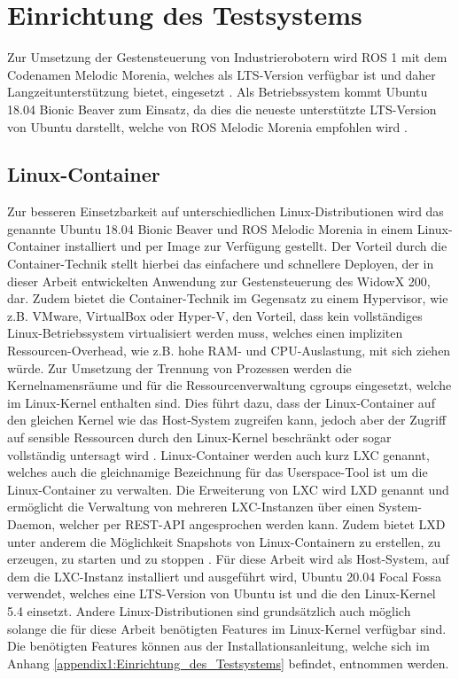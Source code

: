 \section{Einrichtung des Testsystems}
Zur Umsetzung der Gestensteuerung von Industrierobotern wird ROS 1 mit dem Codenamen Melodic Morenia, welches als LTS-Version verfügbar ist und daher Langzeitunterstützung bietet, eingesetzt \cite{robot_operating_system_2020}. Als Betriebssystem kommt Ubuntu 18.04 Bionic Beaver zum Einsatz, da dies die neueste unterstützte LTS-Version von Ubuntu darstellt, welche von ROS Melodic Morenia empfohlen wird \cite{ros_distributions_nodate}.

\subsection{Linux-Container}
Zur besseren Einsetzbarkeit auf unterschiedlichen Linux-Distributionen wird das genannte Ubuntu 18.04 Bionic Beaver und ROS Melodic Morenia in einem Linux-Container installiert und per Image zur Verfügung gestellt. Der Vorteil durch die Container-Technik stellt hierbei das einfachere und schnellere Deployen, der in dieser Arbeit entwickelten Anwendung zur Gestensteuerung des WidowX 200, dar. Zudem bietet die Container-Technik im Gegensatz zu einem Hypervisor, wie z.B. VMware, VirtualBox oder Hyper-V, den Vorteil, dass kein vollständiges Linux-Betriebssystem virtualisiert werden muss, welches einen impliziten Ressourcen-Overhead, wie z.B. hohe RAM- und CPU-Auslastung, mit sich ziehen würde. Zur Umsetzung der Trennung von Prozessen werden die Kernelnamensräume und für die Ressourcenverwaltung cgroups eingesetzt, welche im Linux-Kernel enthalten sind. Dies führt dazu, dass der Linux-Container auf den gleichen Kernel wie das Host-System zugreifen kann, jedoch aber der Zugriff auf sensible Ressourcen durch den Linux-Kernel beschränkt oder sogar vollständig untersagt wird \cite{lxc_2020}. Linux-Container werden auch kurz LXC genannt, welches auch die gleichnamige Bezeichnung für das Userspace-Tool ist um die Linux-Container zu verwalten. Die Erweiterung von LXC wird LXD genannt und ermöglicht die Verwaltung von mehreren LXC-Instanzen über einen System-Daemon, welcher per REST-API angesprochen werden kann. Zudem bietet LXD unter anderem die Möglichkeit Snapshots von Linux-Containern zu erstellen, zu erzeugen, zu starten und zu stoppen \cite{lxc_2017}. Für diese Arbeit wird als Host-System, auf dem die LXC-Instanz installiert und ausgeführt wird, Ubuntu 20.04 Focal Fossa verwendet, welches eine LTS-Version von Ubuntu ist und die den Linux-Kernel 5.4 einsetzt. Andere Linux-Distributionen sind grundsätzlich auch möglich solange die für diese Arbeit benötigten Features im Linux-Kernel verfügbar sind. Die benötigten Features können aus der Installationsanleitung, welche sich im Anhang \ref{appendix1:Einrichtung_des_Testsystems} befindet, entnommen werden.

